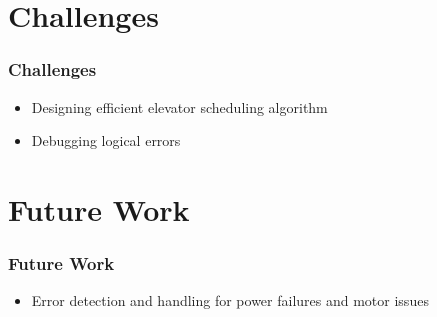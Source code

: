 \documentclass{beamer}
\begin{document}
\section{Challenges}
\begin{frame}
    \frametitle{Challenges}
    \begin{itemize}
        \item Designing efficient elevator scheduling algorithm
        \item Debugging logical errors
    \end{itemize}
\end{frame}

\section{Future Work}
\begin{frame}
    \frametitle{Future Work}
    \begin{itemize}
        \item Error detection and handling for power failures and motor issues
    \end{itemize}
\end{frame}
\end{document}
